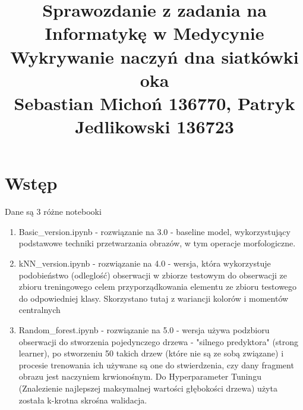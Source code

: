 \documentclass[12pt]{article}
\begin{document}
\title{Sprawozdanie z zadania na Informatykę w Medycynie\\
\large Wykrywanie naczyń dna siatkówki oka\\
\large Sebastian Michoń 136770, Patryk Jedlikowski 136723}
\date{\vspace{-10ex}}
\maketitle

\section{Wstęp}
Dane są 3 różne notebooki
\begin {enumerate}
\item Basic\_version.ipynb - rozwiązanie na 3.0 - baseline model, wykorzystujący podstawowe techniki przetwarzania obrazów, w tym operacje morfologiczne.
\item kNN\_version.ipynb - rozwiązanie na 4.0 - wersja, która wykorzystuje podobieństwo (odleglość) obserwacji w zbiorze testowym do obserwacji ze zbioru treningowego celem przyporządkowania elementu ze zbioru testowego do odpowiedniej klasy. Skorzystano tutaj z wariancji kolorów i momentów centralnych
\item Random\_forest.ipynb - rozwiązanie na 5.0 - wersja używa podzbioru obserwacji do stworzenia pojedynczego drzewa - "silnego predyktora" (strong learner), po stworzeniu 50 takich drzew (które nie są ze sobą związane) i procesie trenowania ich używane są one do stwierdzenia, czy dany fragment obrazu jest naczyniem krwionośnym. Do Hyperparameter Tuningu (Znalezienie najlepszej maksymalnej wartości głębokości drzewa) użyta została k-krotna skrośna walidacja.
\end {enumerate}
\end{document}
